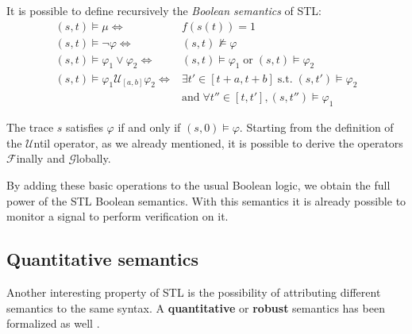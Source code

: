 It is possible to define recursively the \textit{Boolean semantics} of STL:
\begin{align*} %
 (s,t) \models \mu \iff & f(s(t)) = 1 \\
 (s,t) \models \neg \varphi \iff & (s,t) \not\models \varphi \\
 (s,t) \models \varphi_1 \vee \varphi_2 \iff & (s,t) \models \varphi_1 \;\text{or}\; (s,t) \models \varphi_2 \\
 (s,t) \models \varphi_1 \mathcal{U}_{[a,b]} \varphi_2 \iff & \exists t' \in [t+a, t+b] \;\text{s.t.}\; (s,t') \models \varphi_2 \\
 & \text{and}\; \forall t'' \in [t, t'], (s,t'') \models \varphi_1
\end{align*}

The trace $s$ satisfies $\varphi$ if and only if $(s, 0) \models \varphi$.
Starting from the definition of the $\mathcal{U}$ntil operator, as we already mentioned, it is possible to derive the operators $\mathcal{F}$inally and $\mathcal{G}$lobally.

By adding these basic operations to the usual Boolean logic, we obtain the full power of the STL Boolean semantics.
With this semantics it is already possible to monitor a signal to perform verification on it.

\subsection{Quantitative semantics}
Another interesting property of STL is the possibility of attributing different semantics to the same syntax.
A \textbf{quantitative} or \textbf{robust} semantics has been formalized as well \cite{robuststl}.


